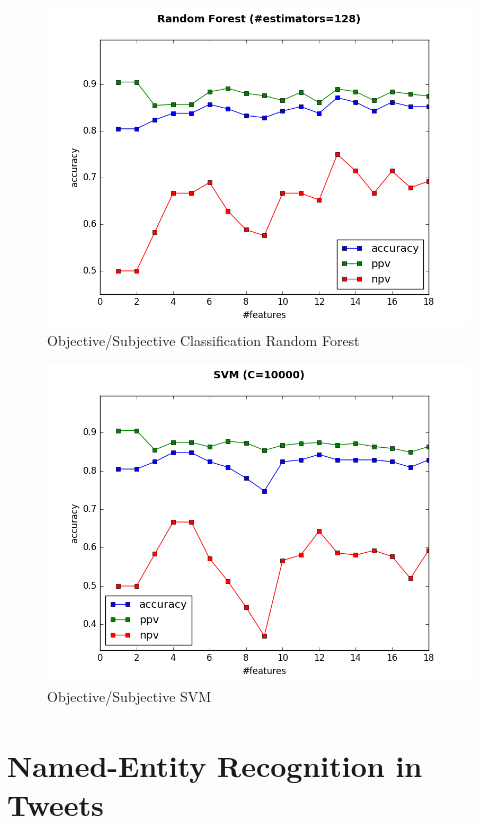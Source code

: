 \documentclass[letterpaper,twocolumn,10pt]{article}
\begin{document}
\begin{figure}[H]
	\centering
	\includegraphics[width=\columnwidth]{../graphs/SentimentAnalysis/random_forest.png}
	\caption{Objective/Subjective Classification Random Forest}
	\label{fig:obj_sub_classification_rf}
\end{figure}

\begin{figure}[H]
	\centering
	\includegraphics[width=\columnwidth]{../graphs/SentimentAnalysis/SVM.png}
	\caption{Objective/Subjective SVM}
	\label{fig:obj_sub_classification_svm}
\end{figure}

\section{Named-Entity Recognition in Tweets}  \label{mission3}
\end{document}
